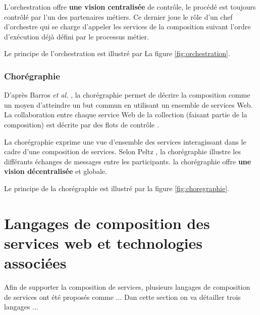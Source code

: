         L'orchestration offre \textbf{une vision centralisée} de
        contrôle, le procédé est toujours contrôlé par l'un des
        partenaires métiers. Ce dernier joue le rôle d'un chef
        d'orchestre qui se charge d'appeler les services de la
        composition suivant l'ordre d'exécution déjà défini par le
        processus métier.

        Le principe de l'orchestration est illustré
        par La figure \ref{fig:orchestration}.

        

        \subsubsection{Chorégraphie}
        \label{sec:choregraphie}

        D'après Barros \emph{et al.} \cite{barros2006standards}, la
        chorégraphie permet de décrire la composition comme un moyen
        d'atteindre un but commun en utilisant un ensemble de services
        Web. La collaboration entre chaque service Web de la
        collection (faisant partie de la composition) est décrite par
        des flots de contrôle \cite{lopez2008selection}.

        La chorégraphie exprime une vue d'ensemble des services
        interagissant dans le cadre d'une composition de
        services. Selon Peltz \cite{peltz2003web}, la chorégraphie
        illustre les différants échanges de messages entre les
        participants. la chorégraphie offre \textbf{une vision
          décentralisée} et globale.

        Le principe de la chorégraphie est illustré par la figure
        \ref{fig:choregraphie}.
        

  \section{Langages de composition des services web et
    technologies associées}
  \label{sec:lang-de-comp}
  Afin de supporter la composition de services, plusieurs langages de
  composition de services ont été proposés comme ...  Dan cette
  section on va détailler trois langages ... \cite{lopez2008selection}

